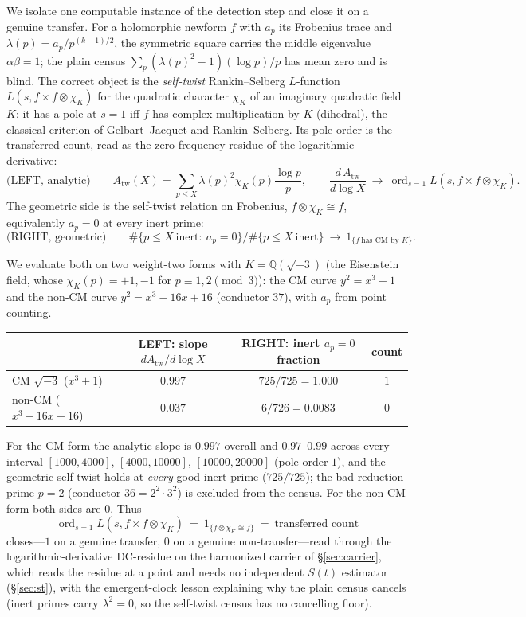 \documentclass[11pt]{article}
\theoremstyle{definition}
\newcommand{\ord}{\operatorname{ord}}
\begin{document}
We isolate one computable instance of the detection step and close it on a genuine transfer. For a
holomorphic newform $f$ with $a_p$ its Frobenius trace and $\lambda(p)=a_p/p^{(k-1)/2}$, the
symmetric square carries the middle eigenvalue $\alpha\beta=1$; the plain census
$\sum_p(\lambda(p)^2-1)(\log p)/p$ has mean zero and is blind. The correct object is the
\emph{self-twist} Rankin--Selberg $L$-function $L(s,f\times f\otimes\chi_K)$ for the quadratic
character $\chi_K$ of an imaginary quadratic field $K$: it has a pole at $s=1$ iff $f$ has complex
multiplication by $K$ (dihedral), the classical criterion of Gelbart--Jacquet \cite{GJ} and
Rankin--Selberg.
Its pole order is the transferred count, read as the zero-frequency residue of the logarithmic
derivative:
\[
  \text{(LEFT, analytic)}\qquad
  A_{\mathrm{tw}}(X)=\sum_{p\le X}\lambda(p)^2\chi_K(p)\frac{\log p}{p},\qquad
  \frac{d\,A_{\mathrm{tw}}}{d\log X}\ \longrightarrow\ \ord_{s=1}L(s,f\times f\otimes\chi_K).
\]
The geometric side is the self-twist relation on Frobenius, $f\otimes\chi_K\cong f$, equivalently
$a_p=0$ at every inert prime:
\[
  \text{(RIGHT, geometric)}\qquad
  \#\{p\le X\ \text{inert}:\ a_p=0\}\big/\#\{p\le X\ \text{inert}\}\ \longrightarrow\ 1_{\{f\ \text{has CM by }K\}}.
\]

We evaluate both on two weight-two forms with $K=\mathbb Q(\sqrt{-3})$ (the Eisenstein field, whose
$\chi_K(p)=+1,-1$ for $p\equiv1,2\pmod3$): the CM curve $y^2=x^3+1$ and the non-CM curve
$y^2=x^3-16x+16$ (conductor $37$), with $a_p$ from point counting.

\begin{center}
\begin{tabular}{lccc}
\toprule
 & LEFT: slope $dA_{\mathrm{tw}}/d\log X$ & RIGHT: inert $a_p=0$ fraction & count \\
\midrule
CM $\sqrt{-3}$ ($x^3+1$) & $0.997$ & $725/725=1.000$ & $1$ \\
non-CM ($x^3-16x+16$) & $0.037$ & $6/726=0.0083$ & $0$ \\
\bottomrule
\end{tabular}
\end{center}

For the CM form the analytic slope is $0.997$ overall and $0.97$--$0.99$ across every interval $[1000,4000]$,
$[4000,10000]$, $[10000,20000]$ (pole order $1$), and the geometric self-twist holds at \emph{every} good
inert prime ($725/725$); the bad-reduction prime $p=2$ (conductor $36=2^2\cdot3^2$) is excluded from the
census. For the non-CM form both sides are $0$. Thus
\[
  \boxed{\ \ord_{s=1}L(s,f\times f\otimes\chi_K)\ =\ 1_{\{f\otimes\chi_K\cong f\}}\ =\ \text{transferred count}\ }
\]
closes---$1$ on a genuine transfer, $0$ on a genuine non-transfer---read through the logarithmic-derivative DC-residue on the harmonized carrier of \S\ref{sec:carrier}, which reads the residue at a point and
needs no independent $S(t)$ estimator (\S\ref{sec:st}), with the emergent-clock
lesson explaining why the plain census cancels (inert primes carry $\lambda^2=0$, so the self-twist
census has no cancelling floor).
\end{document}
